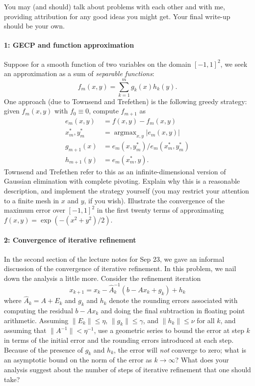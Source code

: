 \documentclass[12pt, leqno]{article} %
\begin{document}

You may (and should) talk about problems with each other and with me,
providing attribution for any good ideas you might get.  Your final
write-up should be your own.


\paragraph*{1: GECP and function approximation}
Suppose for a smooth function of two variables on the domain
$[-1,1]^2$, we seek an approximation as a sum of {\em separable functions}:
\[
  f_m(x,y) = \sum_{k=1}^m g_k(x) h_k(y).
\]
One approach (due to Townsend and Trefethen) is the following greedy
strategy: given $f_m(x,y)$ with $f_0 \equiv 0$, compute $f_{m+1}$ as
\begin{align*}
  e_{m}(x,y) &= f(x,y) - f_m(x,y) \\
  x_m^*, y_m^* &= \operatorname{argmax}_{x,y} |e_m(x,y)| \\
  g_{m+1}(x) &= e_m(x, y_m^*) / e_m(x_m^*, y_m^*) \\
  h_{m+1}(y) &= e_m(x_m^*, y).
\end{align*}
Townsend and Trefethen refer to this as an infinite-dimensional
version of Gaussian elimination with complete pivoting.  Explain why
this is a reasonable description, and implement the strategy yourself
(you may restrict your attention to a finite mesh in $x$ and $y$, if
you wish).  Illustrate the convergence of the maximum error over
$[-1,1]^2$ in the first twenty terms of approximating
$f(x,y) = \exp(-(x^2+y^2)/2)$.

\paragraph*{2: Convergence of iterative refinement}
In the second section of the lecture notes for Sep 23, we gave an
informal discussion of the convergence of iterative refinement.  In
this problem, we nail down the analysis a little more.  Consider the
refinement iteration
\[
  x_{k+1} = x_k - \hat{A}_k^{-1} (b - A x_k + g_k) + h_k
\]
where $\hat{A}_k = A + E_k$ and $g_k$ and $h_k$ denote the rounding
errors associated with computing the residual $b-Ax_k$ and doing the
final subtraction in floating point arithmetic.  Assuming $\|E_k\|
\leq \eta$, $\|g_k\| \leq \gamma$, and $\|h_k\| \leq \nu$ for all $k$,
and assuming that $\|A^{-1}\| < \eta^{-1}$, use a geometric series to
bound the error at step $k$ in terms of the initial error and the
rounding errors introduced at each step.  Because of the presence of
$g_k$ and $h_k$, the error will {\em not} converge to zero; what is an
asymptotic bound on the norm of the error as $k \rightarrow \infty$?
What does your analysis suggest about the number of steps of iterative
refinement that one should take?
\end{document}
